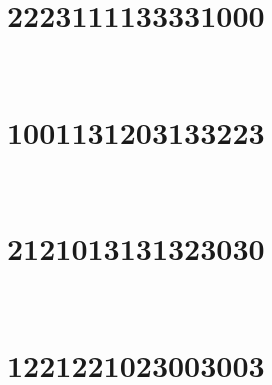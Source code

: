 \marginnote[3\baselineskip]{\centering}



\,
\newline
\vspace{1.2cm}

\section{2223111133331000}

\marginnote[3\baselineskip]{\centering}



\,
\newline
\vspace{1.2cm}

\section{1001131203133223}

\marginnote[3\baselineskip]{\centering}



\,
\newline
\vspace{1.2cm}

\section{2121013131323030}

\marginnote[3\baselineskip]{\centering}



\,
\newline
\vspace{1.2cm}

\section{1221221023003003}

\marginnote[3\baselineskip]{\centering}

